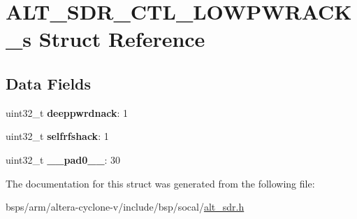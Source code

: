\hypertarget{structALT__SDR__CTL__LOWPWRACK__s}{}\section{A\+L\+T\+\_\+\+S\+D\+R\+\_\+\+C\+T\+L\+\_\+\+L\+O\+W\+P\+W\+R\+A\+C\+K\+\_\+s Struct Reference}
\label{structALT__SDR__CTL__LOWPWRACK__s}
\subsection*{Data Fields}
\begin{DoxyCompactItemize}
\item 
\mbox{\label{structALT__SDR__CTL__LOWPWRACK__s_a9b27257ff97b35d7dcd8d152c3dd805b}} 
uint32\+\_\+t {\bfseries deeppwrdnack}\+: 1
\item 
\mbox{\label{structALT__SDR__CTL__LOWPWRACK__s_a30be0d0fe29813f84406c627fbd24d32}} 
uint32\+\_\+t {\bfseries selfrfshack}\+: 1
\item 
\mbox{\label{structALT__SDR__CTL__LOWPWRACK__s_a908503c5ff6ed66318ffe051539734a6}} 
uint32\+\_\+t {\bfseries \+\_\+\+\_\+pad0\+\_\+\+\_\+}\+: 30
\end{DoxyCompactItemize}


The documentation for this struct was generated from the following file\+:\begin{DoxyCompactItemize}
\item 
bsps/arm/altera-\/cyclone-\/v/include/bsp/socal/\mbox{\hyperlink{alt__sdr_8h}{alt\+\_\+sdr.\+h}}\end{DoxyCompactItemize}
